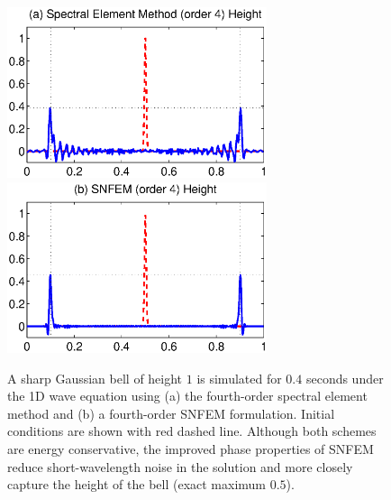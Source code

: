\documentclass[11pt]{article}
\begin{document}
\begin{figure}
\begin{center}
\includegraphics[width=3in]{SimulatedBell_SE}
\includegraphics[width=3in]{SimulatedBell_SNFEM}
\end{center}
\caption{A sharp Gaussian bell of height $1$ is simulated for $0.4$ seconds under the 1D wave equation using (a) the fourth-order spectral element method and (b) a fourth-order SNFEM formulation.  Initial conditions are shown with red dashed line.  Although both schemes are energy conservative, the improved phase properties of SNFEM reduce short-wavelength noise in the solution and more closely capture the height of the bell (exact maximum $0.5$).}  \label{fig:SimulatedBell}
\end{figure}

\end{document}
